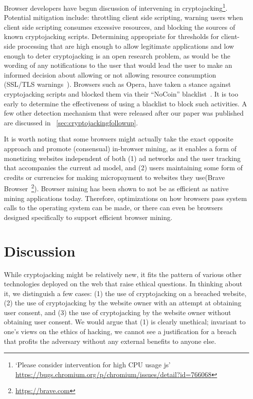 Browser developers have begun discussion of intervening in cryptojacking\footnote{`Please consider intervention for high CPU usage js' \url{https://bugs.chromium.org/p/chromium/issues/detail?id=766068}}. Potential mitigation include: throttling client side scripting, warning users when client side scripting consumes excessive resources, and blocking the sources of known cryptojacking scripts. Determining appropriate for thresholds for client-side processing that are high enough to allow legitimate applications and low enough to deter cryptojacking is an open research problem, as would be the wording of any notifications to the user that would lead the user to make an informed decision about allowing or not allowing resource consumption (\cf SSL/TLS warnings~\cite{SEAAC09,SHB11,Acer:2017:WWR:3133956.3134007}).
Browsers such as Opera, have taken a stance against cryptojacking scripts and blocked them via their ``NoCoin'' blacklist~\cite{operanocoin}. It is too early to determine the effectiveness of using a blacklist to block such activities.  A few other detection mechanism that were released after our paper was published are discussed in ~\ref{sec:cryptojackingfollowup}.

It is worth noting that some browsers might actually take the exact opposite approach and promote (consensual) in-browser mining, as it enables a form of monetizing websites independent of both (1) ad networks and the user tracking that accompanies the current ad model, and (2) users maintaining some form of credits or currencies for making micropayment to websites they use(\eg Brave Browser~\footnote{\url{https://brave.com}}). Browser mining has been shown to not be as efficient as native mining applications today. Therefore, optimizations on how browsers pass system calls to the operating system can be made, or there can even be browsers designed specifically to support efficient browser mining. 



\section{Discussion}
\label{sec:ethics}

While cryptojacking might be relatively new, it fits the pattern of various other technologies deployed on the web that raise ethical questions. In thinking about it, we distinguish a few cases: (1) the use of cryptojacking on a breached website, (2) the use of cryptojacking by the website owner with an attempt at obtaining user consent, and (3) the use of cryptojacking by the website owner without obtaining user consent. We would argue that (1) is clearly unethical; invariant to one's views on the ethics of hacking, we cannot see a justification for a breach that profits the adversary without any external benefits to anyone else.


